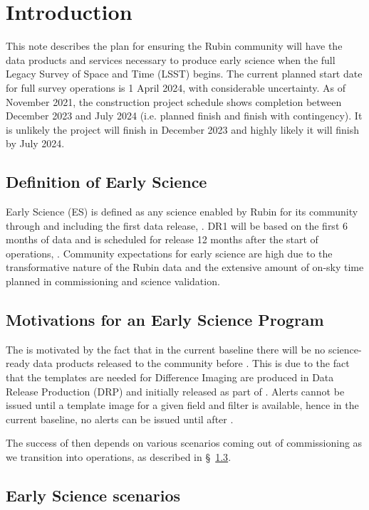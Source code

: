 \section{Introduction}

This  note describes the plan for ensuring the Rubin community will have the data products and services necessary to produce early science when the full Legacy Survey of Space and Time (LSST)  begins. 
The current planned start date for full survey operations is 1 April 2024, with considerable uncertainty. 
As of November 2021, the construction project schedule shows completion between December 2023 and July 2024 (i.e. planned finish and finish with contingency). 
It is unlikely the project will finish in December 2023 and highly likely it will finish by July 2024. 

\subsection{Definition of Early Science}  \label{ssec:defn}

Early Science (ES) is defined as any science enabled by Rubin for its community through and including the first data release, \drone.
DR1 will be based on the first 6 months of data and is scheduled for release 12 months after the start of operations, \citep{RDO-011}.
Community expectations for early science are high due to the transformative nature of the Rubin data and the extensive amount of on-sky time planned in commissioning and science validation.

\subsection{Motivations for an Early Science Program}

The \esp is motivated by the fact that in the current baseline there will be no science-ready data products released to the community before \drone.
This is due to the fact that the templates are needed for Difference Imaging are produced in Data Release Production (DRP) and initially released as part of \drone. 
Alerts cannot be issued until a template image for a given field and filter is available, hence  in the current baseline, no alerts can be issued until after \drone.

The success of \es then depends on various scenarios coming out of commissioning as we transition into operations, as described in \S~\ref{ssec:scenarios}. 

\subsection{Early Science scenarios } \label{ssec:scenarios}

